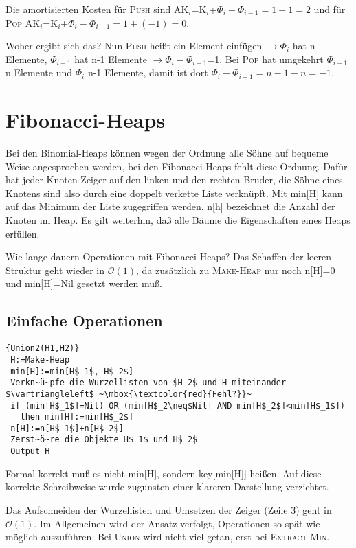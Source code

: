 \documentclass[ngerman,draft,parskip=half*,twoside]{scrreprt}
\theoremstyle{break}
\theoremstyle{nonumberbreak}
\newcommand*{\OO}{\mathcal{O}}      %
\begin{document}
Die amortisierten Kosten für  \textsc{Push} sind AK$_i$=K$_i$+${\Phi}_i-{\Phi}_{i-1}=1+1=2$
und für  \textsc{Pop} AK$_i$=K$_i$+${\Phi}_i-{\Phi}_{i-1}=1+(-1)=0$.

Woher ergibt sich das? Nun \textsc{Push} heißt ein Element einfügen $\rightarrow {\Phi}_i$ hat n Elemente,
${\Phi}_{i-1}$
 hat n-1 Elemente $ \rightarrow {\Phi}_i-{\Phi}_{i-1}$=1. Bei \textsc{Pop} hat umgekehrt ${\Phi}_{i-1}$ n Elemente und
 ${\Phi}_i $ n-1
Elemente, damit ist dort ${\Phi}_i-{\Phi}_{i-1}=n-1-n=-1$.  

\section{Fibonacci-Heaps}
Bei den Binomial-Heaps können wegen der Ordnung alle Söhne auf bequeme Weise angesprochen werden, bei den
Fibonacci-Heaps fehlt diese Ordnung. Dafür hat jeder Knoten Zeiger auf den linken und den rechten Bruder, die Söhne
eines Knotens sind also durch eine doppelt verkette Liste verknüpft. Mit min[H] kann auf das Minimum der Liste
zugegriffen werden, n[h] bezeichnet die Anzahl der Knoten im Heap. Es gilt weiterhin, daß alle Bäume die
Eigenschaften eines Heaps erfüllen.

Wie lange dauern Operationen mit Fibonacci-Heaps? Das Schaffen der leeren Struktur geht wieder in $\OO(1)$, da zusätzlich
zu \textsc{Make-Heap} nur noch n[H]=0 und min[H]=Nil gesetzt werden muß.

\subsection{Einfache Operationen}
\begin{Algorithmus}[H]
\begin{lstlisting}[frame=tlrb, mathescape=true, title=\textsc{Union\textnormal{(H$_1$, H$_2$)}},gobble=1]{Union2(H1,H2)}
 H:=Make-Heap
 min[H]:=min[H$_1$, H$_2$]
 Verkn~ü~pfe die Wurzellisten von $H_2$ und H miteinander $\vartriangleleft$ ~\mbox{\textcolor{red}{Fehl?}}~
 if (min[H$_1$]=Nil) OR (min[H$_2\neq$Nil] AND min[H$_2$]<min[H$_1$])
   then min[H]:=min[H$_2$]
 n[H]:=n[H$_1$]+n[H$_2$]
 Zerst~ö~re die Objekte H$_1$ und H$_2$
 Output H     
\end{lstlisting}
Formal korrekt muß es nicht min[H], sondern key[min[H]] heißen. Auf diese korrekte Schreibweise wurde
zugunsten einer klareren Darstellung verzichtet.
\end{Algorithmus}
Das Aufschneiden der Wurzellisten und Umsetzen der Zeiger (Zeile 3) geht in $\OO(1)$. Im Allgemeinen wird der Ansatz
verfolgt, Operationen so spät wie möglich auszuführen. Bei \textsc{Union} wird nicht viel getan, erst bei
\textsc{Extract-Min}.
\end{document}
